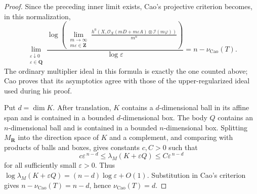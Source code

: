 \begin{proof}
Since the preceding inner limit exists, Cao's projective criterion
\cite[Proposition~4.4]{Cao14} becomes, in this normalization,
\[
 \lim_{\substack{\varepsilon\downarrow0\\
                  \varepsilon\in\mathbf Q}}
 \frac{\log\!\left(
   \displaystyle\lim_{\substack{m\to\infty\\m\varepsilon\in\mathbf Z}}
   \frac{h^0\!\left(X,\mathcal O_X(mD+m\varepsilon A)
                    \otimes\mathcal I(m\varphi)\right)}{m^n}
   \right)}{\log\varepsilon}
 =n-\nu_{\mathrm{Cao}}(T).
\]
The ordinary multiplier ideal in this formula is exactly the one counted
above; Cao proves that its asymptotics agree with those of the
upper-regularized ideal used during his proof.

Put \(d=\dim K\).
After translation, \(K\) contains a \(d\)-dimensional ball in its affine
span and is contained in a bounded \(d\)-dimensional box.  The body \(Q\)
contains an \(n\)-dimensional ball and is contained in a bounded
\(n\)-dimensional box.  Splitting \(M_{\mathbf R}\) into the direction space
of \(K\) and a complement, and comparing with products of balls and boxes,
gives constants \(c,C>0\) such that
\[
 c\varepsilon^{\,n-d}
 \leq\lambda_M(K+\varepsilon Q)
 \leq C\varepsilon^{\,n-d}
\tag{55.52}\label{eq:ok-toric-tube-growth}
\]
for all sufficiently small \(\varepsilon>0\).
Thus
\(\log\lambda_M(K+\varepsilon Q)
 =(n-d)\log\varepsilon+O(1)\).  Substitution in Cao's criterion gives
\(n-\nu_{\mathrm{Cao}}(T)=n-d\), hence
\(\nu_{\mathrm{Cao}}(T)=d\).
\end{proof}
